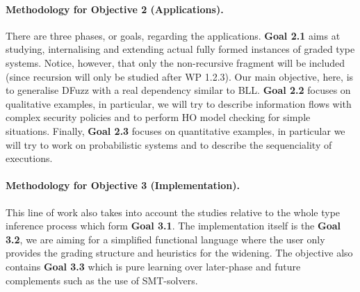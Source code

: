 \documentclass{article}[11pt]
\begin{document}
\paragraph{Methodology for Objective 2 (Applications).}

There are three phases, or goals, regarding the applications. {\bf Goal 2.1} aims at studying, internalising and extending actual fully formed instances of graded type systems. Notice, however, that only the non-recursive fragment will be included (since recursion will only be studied after WP 1.2.3). Our main objective, here, is to generalise DFuzz with a real dependency similar to BLL. {\bf Goal 2.2} focuses on qualitative examples, in particular, we will try to describe information flows with complex security policies and to perform HO model checking for simple situations. Finally, {\bf Goal 2.3} focuses on quantitative examples, in particular we will try to work on probabilistic systems and to describe the sequenciality of executions.

\paragraph{Methodology for Objective 3 (Implementation).}

This line of work also takes into account the studies relative to the whole type inference process which form {\bf Goal 3.1}. The implementation itself is the {\bf Goal 3.2}, we are aiming for a simplified functional language where the user only provides the grading structure and heuristics for the widening. The objective also contains {\bf Goal 3.3} which is pure learning over later-phase and future complements such as the use of SMT-solvers.



%
%
\end{document}
